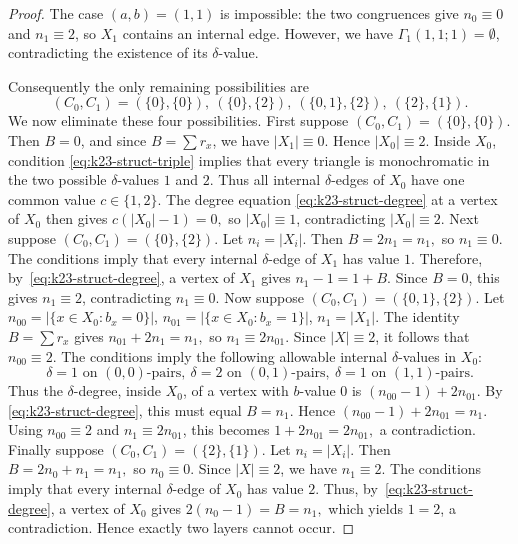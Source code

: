 \documentclass[10pt,a4paper]{amsart}
\begin{document}
\begin{proof}
    The case \((a,b)=(1,1)\) is impossible: the two congruences give
    \(n_0\equiv0\) and \(n_1\equiv2\), so \(X_1\) contains an internal edge.
    However, we have $\Gamma_1(1,1;1)=\emptyset$, contradicting the existence of its \(\delta\)-value.

    Consequently the only remaining possibilities are
    \[
        (C_0,C_1)=(\{0\},\{0\}),\
        (\{0\},\{2\}),\
        (\{0,1\},\{2\}),\
        (\{2\},\{1\}).
    \]
    We now eliminate these four possibilities.
    First suppose
    \((C_0,C_1)=(\{0\},\{0\}).\)
    Then \(B=0\), and since \(B=\sum r_x\), we have \(|X_1|\equiv 0\). Hence \(|X_0|\equiv 2\). Inside \(X_0\), condition \eqref{eq:k23-struct-triple} implies that every triangle is monochromatic in the two possible \(\delta\)-values \(1\) and \(2\). Thus all internal \(\delta\)-edges of \(X_0\) have one common value \(c\in\{1,2\}\). The degree equation \eqref{eq:k23-struct-degree} at a vertex of \(X_0\) then gives
    \(c(|X_0|-1)=0,\)
    so \(|X_0|\equiv 1\), contradicting \(|X_0|\equiv 2\).
    Next suppose
    \((C_0,C_1)=(\{0\},\{2\}).\)
    Let \(n_i=|X_i|\). Then
    \(B=2n_1=n_1,\)
    so \(n_1\equiv 0\). The conditions imply that every internal \(\delta\)-edge of \(X_1\) has value \(1\). Therefore, by~\eqref{eq:k23-struct-degree}, a vertex of \(X_1\) gives
    \(n_1-1=1+B.\)
    Since \(B=0\), this gives \(n_1\equiv 2\), contradicting \(n_1\equiv 0\).
    Now suppose
    \((C_0,C_1)=(\{0,1\},\{2\}).\)
    Let
    \(n_{00}=|\{x\in X_0:b_x=0\}|\), \(n_{01}=|\{x\in X_0:b_x=1\}|\), \(n_1=|X_1|.\)
    The identity \(B=\sum r_x\) gives
    \(n_{01}+2n_1=n_1,\)
    so
    \(n_1\equiv 2n_{01}.\)
    Since \(|X|\equiv 2\), it follows that
    \(n_{00}\equiv 2.\)
    The conditions imply the following allowable internal \(\delta\)-values in \(X_0\):
    \[\delta=1 \text{ on } (0,0)\text{-pairs},\
        \delta=2 \text{ on } (0,1)\text{-pairs},\
        \delta=1 \text{ on } (1,1)\text{-pairs}.
    \]
    Thus the \(\delta\)-degree, inside \(X_0\), of a vertex with \(b\)-value \(0\) is
    \((n_{00}-1)+2n_{01}.\)
    By \eqref{eq:k23-struct-degree}, this must equal \(B=n_1\). Hence
    \((n_{00}-1)+2n_{01}=n_1.\)
    Using \(n_{00}\equiv 2\) and \(n_1\equiv 2n_{01}\), this becomes
    \(1+2n_{01}=2n_{01},\)
    a contradiction.
    Finally suppose
    \((C_0,C_1)=(\{2\},\{1\}).\)
    Let \(n_i=|X_i|\). Then
    \(B=2n_0+n_1=n_1,\)
    so \(n_0\equiv 0\). Since \(|X|\equiv 2\), we have \(n_1\equiv 2\). The conditions imply that every internal \(\delta\)-edge of \(X_0\) has value \(2\). Thus, by~\eqref{eq:k23-struct-degree}, a vertex of \(X_0\) gives
    \(2(n_0-1)=B=n_1,\) which yields \(1=2\), a contradiction. Hence exactly two layers cannot occur.


\end{proof}
\end{document}
